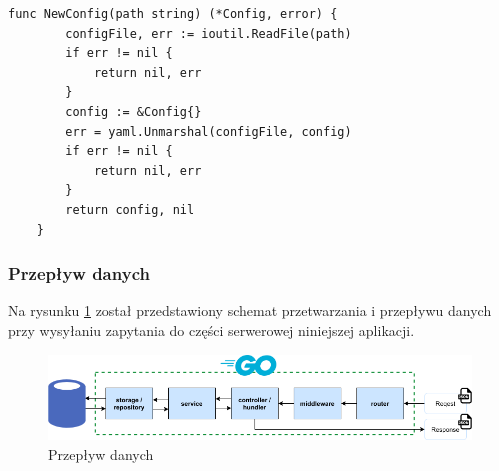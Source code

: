 \begin{lstlisting}[label=list:config_restapi_new,caption=Wczytanie pliku konfiguracyjnego części serwerowej,basicstyle=\tiny\ttfamily]
    func NewConfig(path string) (*Config, error) {
        configFile, err := ioutil.ReadFile(path)
        if err != nil {
            return nil, err
        }
        config := &Config{}
        err = yaml.Unmarshal(configFile, config)
        if err != nil {
            return nil, err
        }
        return config, nil
    }
\end{lstlisting}
% 
\subsubsection{Przepływ danych}
Na rysunku \ref{fig:backend_data_flow} został przedstawiony schemat przetwarzania i przepływu danych przy wysyłaniu zapytania do części serwerowej niniejszej aplikacji.
\begin{figure}[ht]
\centering
\includegraphics[width=1\linewidth]{rys03/backend_data_flow.png}
\caption{Przepływ danych}
\label{fig:backend_data_flow}
\end{figure}

% 
